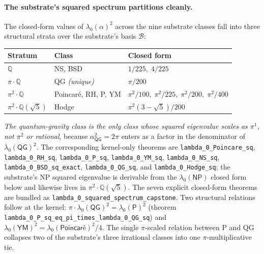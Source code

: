 \documentclass[11pt,a4paper]{amsart}
\theoremstyle{plain}
\theoremstyle{definition}
\begin{document}
\paragraph{The substrate's squared spectrum partitions cleanly.} The closed-form values of $\lambda_0(\alpha)^2$ across the nine substrate classes fall into three structural strata over the substrate's basis $\mathcal{B}$:
\begin{center}
\begin{tabular}{lll}
\toprule
Stratum & Class & Closed form \\
\midrule
$\mathbb{Q}$           & NS, BSD                                       & $1/225,\;4/225$ \\
$\pi\cdot\mathbb{Q}$   & QG \emph{(unique)}                           & $\pi/200$ \\
$\pi^2\cdot\mathbb{Q}$ & Poincar\'e, RH, P, YM                         & $\pi^2/100,\;\pi^2/225,\;\pi^2/200,\;\pi^2/400$ \\
$\pi^2\cdot\mathbb{Q}(\sqrt{5})$ & Hodge                              & $\pi^2(3-\sqrt{5})/200$ \\
\bottomrule
\end{tabular}
\end{center}
\textit{The quantum-gravity class is the only class whose squared eigenvalue scales as $\pi^1$, not $\pi^2$ or rational}, because $\alpha_{\textsf{QG}}^2 = 2\pi$ enters as a factor in the denominator of $\lambda_0(\textsf{QG})^2$. The corresponding kernel-only theorems are \texttt{lambda\_0\_Poincare\_sq}, \texttt{lambda\_0\_RH\_sq}, \texttt{lambda\_0\_P\_sq}, \texttt{lambda\_0\_YM\_sq}, \texttt{lambda\_0\_NS\_sq}, \texttt{lambda\_0\_BSD\_sq\_exact}, \texttt{lambda\_0\_QG\_sq}, and \texttt{lambda\_0\_Hodge\_sq}; the substrate's NP squared eigenvalue is derivable from the $\lambda_0(\textsf{NP})$ closed form below and likewise lives in $\pi^2\cdot\mathbb{Q}(\sqrt{5})$. The seven explicit closed-form theorems are bundled as \texttt{lambda\_0\_squared\_spectrum\_capstone}. Two structural relations follow at the kernel: $\pi \cdot \lambda_0(\textsf{QG})^2 = \lambda_0(\textsf{P})^2$ (theorem \texttt{lambda\_0\_P\_sq\_eq\_pi\_times\_lambda\_0\_QG\_sq}) and $\lambda_0(\textsf{YM})^2 = \lambda_0(\textsf{Poincar\'e})^2/4$. The single $\pi$-scaled relation between P and QG collapses two of the substrate's three irrational classes into one $\pi$-multiplicative tie.
\end{document}
